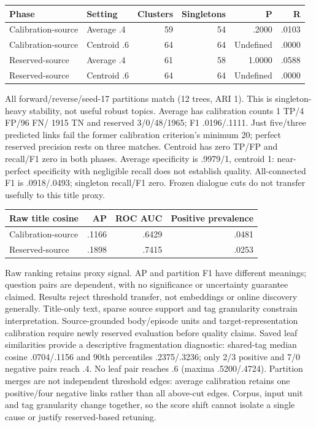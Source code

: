 \documentclass[11pt]{article}
\begin{document}
\begin{center}
\begin{tabular}{llrrrr}
\toprule
Phase & Setting & Clusters & Singletons & P & R \\
\midrule
Calibration-source & Average .4 & 59 & 54 & .2000 & .0103 \\
Calibration-source & Centroid .6 & 64 & 64 & Undefined & .0000 \\
Reserved-source & Average .4 & 61 & 58 & 1.0000 & .0588 \\
Reserved-source & Centroid .6 & 64 & 64 & Undefined & .0000 \\
\bottomrule
\end{tabular}
\end{center}
All forward/reverse/seed-17 partitions match (12 trees, ARI 1). This is singleton-heavy
stability, not useful robust topics. Average has calibration counts 1 TP/4 FP/96 FN/
1915 TN and reserved 3/0/48/1965; F1 .0196/.1111. Just five/three predicted links
fail the former calibration criterion's minimum 20; perfect reserved precision
rests on three matches. Centroid has zero TP/FP and recall/F1 zero in both phases.
Average specificity is .9979/1, centroid 1: near-perfect specificity with negligible
recall does not establish quality. All-connected F1 is .0918/.0493; singleton
recall/F1 zero. Frozen dialogue cuts do not transfer usefully to this title proxy.

\begin{center}
\begin{tabular}{lrrr}
\toprule
Raw title cosine & AP & ROC AUC & Positive prevalence \\
\midrule
Calibration-source & .1166 & .6429 & .0481 \\
Reserved-source & .1898 & .7415 & .0253 \\
\bottomrule
\end{tabular}
\end{center}
Raw ranking retains proxy signal. AP and partition F1 have different meanings;
question pairs are dependent, with no significance or uncertainty guarantee
claimed. Results reject threshold transfer, not embeddings or online discovery
generally. Title-only text, sparse source support and tag granularity constrain
interpretation. Source-grounded body/episode units and target-representation
calibration require newly reserved evaluation before quality claims.
Saved leaf similarities provide a descriptive fragmentation diagnostic:
shared-tag median cosine .0704/.1156 and 90th percentiles .2375/.3236;
only 2/3 positive and 7/0 negative pairs reach .4. No leaf pair reaches .6
(maxima .5200/.4724). Partition merges are not independent threshold edges:
average calibration retains one positive/four negative links rather than all
above-cut edges. Corpus, input unit and tag granularity change together, so
the score shift cannot isolate a single cause or justify reserved-based retuning.
\end{document}

